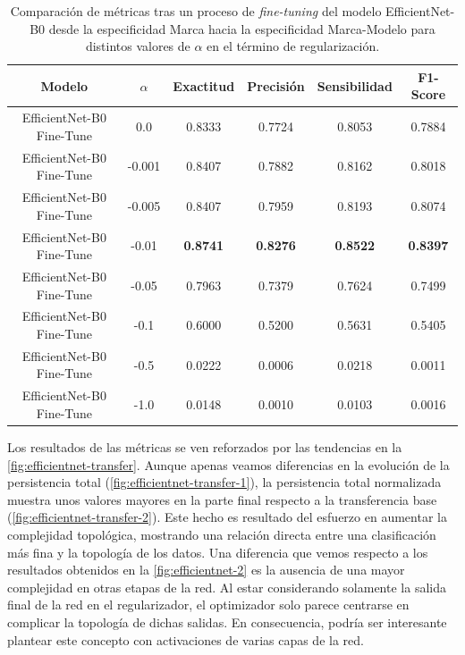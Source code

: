 \begin{table}[H]
	\centering
	\begin{adjustbox}
		{width=0.8\textwidth}
		\begin{tabular}{|c|c|c|c|c|c|}
			\hline
			\textbf{Modelo}           & $\alpha$ & \textbf{Exactitud} & \textbf{Precisión} & \textbf{Sensibilidad} & \textbf{F1-Score} \\
			\hline
			EfficientNet-B0 Fine-Tune & 0.0      & 0.8333             & 0.7724             & 0.8053                & 0.7884            \\
			\hline
			EfficientNet-B0 Fine-Tune & -0.001   & 0.8407             & 0.7882             & 0.8162                & 0.8018            \\
			\hline
			EfficientNet-B0 Fine-Tune & -0.005   & 0.8407             & 0.7959             & 0.8193                & 0.8074            \\
			\hline
			EfficientNet-B0 Fine-Tune & -0.01    & \textbf{0.8741}    & \textbf{0.8276}    & \textbf{0.8522}       & \textbf{0.8397}   \\
			\hline
			EfficientNet-B0 Fine-Tune & -0.05    & 0.7963             & 0.7379             & 0.7624                & 0.7499            \\
			\hline
			EfficientNet-B0 Fine-Tune & -0.1     & 0.6000             & 0.5200             & 0.5631                & 0.5405            \\
			\hline
			EfficientNet-B0 Fine-Tune & -0.5     & 0.0222             & 0.0006             & 0.0218                & 0.0011            \\
			\hline
			EfficientNet-B0 Fine-Tune & -1.0     & 0.0148             & 0.0010             & 0.0103                & 0.0016            \\
			\hline
		\end{tabular}
	\end{adjustbox}
	\caption{Comparación de métricas tras un proceso de \textit{fine-tuning} del modelo
		EfficientNet-B0 desde la especificidad Marca hacia la especificidad Marca-Modelo
		para distintos valores de $\alpha$ en el término de regularización.}
	\label{tab:efficientnet-transfer}
\end{table}

Los resultados de las métricas se ven reforzados por las tendencias en la
\autoref{fig:efficientnet-transfer}. Aunque apenas veamos diferencias en la evolución
de la persistencia total (\autoref{fig:efficientnet-transfer-1}), la
persistencia total normalizada muestra unos valores mayores en la parte final
respecto a la transferencia base (\autoref{fig:efficientnet-transfer-2}). Este hecho
es resultado del esfuerzo en aumentar la complejidad topológica, mostrando una
relación directa entre una clasificación más fina y la topología de los datos. Una
diferencia que vemos respecto a los resultados obtenidos en la \autoref{fig:efficientnet-2}
es la ausencia de una mayor complejidad en otras etapas de la red. Al estar
considerando solamente la salida final de la red en el regularizador, el optimizador
solo parece centrarse en complicar la topología de dichas salidas. En
consecuencia, podría ser interesante plantear este concepto con activaciones de varias
capas de la red.

